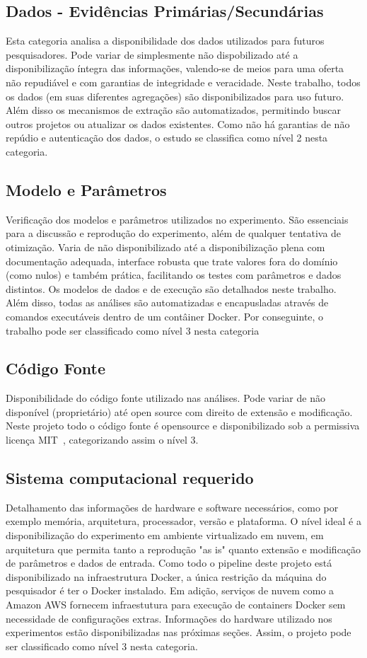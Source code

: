 \documentclass[12pt,openany,oneside,a4paper,english,brazil]{abntbibufjf}
\begin{document}
    \subsection{Dados - Evidências Primárias/Secundárias} Esta categoria analisa a disponibilidade dos dados utilizados para futuros pesquisadores. Pode variar de simplesmente não dispobilizado até a disponibilização íntegra das informações, valendo-se de meios para uma oferta não repudiável e com garantias de integridade e veracidade. Neste trabalho, todos os dados (em suas diferentes agregações) são disponibilizados para uso futuro. Além disso os mecanismos de extração são automatizados, permitindo buscar outros projetos ou atualizar os dados existentes. Como não há garantias de não repúdio e autenticação dos dados, o estudo se classifica como nível 2 nesta categoria.

    \subsection{Modelo e Parâmetros} Verificação dos modelos e parâmetros utilizados no experimento. São essenciais para a discussão e reprodução do experimento, além de qualquer tentativa de otimização. Varia de não disponibilizado até a disponibilização plena com documentação adequada, interface robusta que trate valores fora do domínio (como nulos) e também prática, facilitando os testes com parâmetros e dados distintos. Os modelos de dados e de execução são detalhados neste trabalho. Além disso, todas as análises são automatizadas e encapusladas através de comandos executáveis dentro de um contâiner Docker. Por conseguinte, o trabalho pode ser classificado como nível 3 nesta categoria

    \subsection{Código Fonte} Disponibilidade do código fonte utilizado nas análises. Pode variar de não disponível (proprietário) até open source com direito de extensão e modificação. Neste projeto todo o código fonte é opensource e disponibilizado sob a permissiva licença MIT~\cite{mit}, categorizando assim o nível 3.

    \subsection{Sistema computacional requerido} Detalhamento das informações de hardware e software necessários, como por exemplo memória, arquitetura, processador, versão e plataforma. O nível ideal é a disponibilização do experimento em ambiente virtualizado em nuvem, em arquitetura que permita tanto a reprodução "as is" quanto extensão e modificação de parâmetros e dados de entrada. Como todo o pipeline deste projeto está disponibilizado na infraestrutura Docker, a única restrição da máquina do pesquisador é ter o Docker instalado. Em adição, serviços de nuvem como a Amazon AWS fornecem infraestutura para execução de containers Docker sem necessidade de configurações extras. Informações do hardware utilizado nos experimentos estão disponibilizadas nas próximas seções. Assim, o projeto pode ser classificado como nível 3 nesta categoria.
\end{document}
